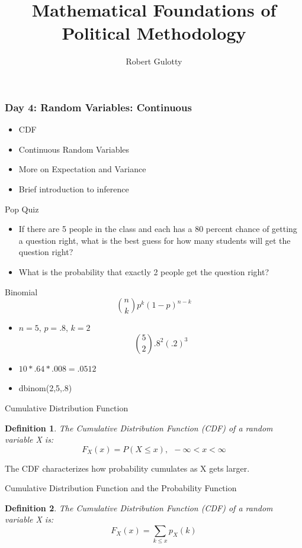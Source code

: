 \documentclass{beamer}
\title[PLSC 43401]{Mathematical Foundations of Political Methodology}
\author{Robert Gulotty}
\institute[Chicago]{University of Chicago}
\newtheorem{defn}{Definition}
\numberwithin{equation}{section}
\begin{document}
\begin{frame}
\maketitle
\end{frame}


\begin{frame}
\frametitle{Day 4: Random Variables: Continuous}
\begin{itemize}
\item CDF
\item Continuous Random Variables
\item More on Expectation and Variance
\item Brief introduction to inference
\end{itemize}
\end{frame}


\begin{frame}{Pop Quiz}
\begin{itemize}
\item If there are 5 people in the class and each has a 80 percent chance of getting a question right, what is the best guess for how many students will get the question right?
\item What is the probability that exactly 2 people get the question right?  
\end{itemize}
\end{frame}


\begin{frame}{Binomial}
$${n \choose k}p^k(1-p)^{n-k}$$

\begin{itemize}
\item $n=5$, $p=.8$, $k=2$\pause
$${5 \choose 2}.8^{2}(.2)^{3}$$
\item $10*.64*.008=.0512$
\item dbinom(2,5,.8)
\end{itemize}
\end{frame}


\begin{frame}{Cumulative Distribution Function}
\begin{defn}
The Cumulative Distribution Function (CDF) of a random variable X is:
$$F_X(x)=P(X\leq x),\ \ -\infty<x<\infty$$
\end{defn}

The CDF characterizes how probability cumulates as X gets larger.
\end{frame}

\begin{frame}{Cumulative Distribution Function and the Probability Function}
\begin{defn}
The Cumulative Distribution Function (CDF) of a random variable X is:
$$F_X(x)=\sum_{k\leq x} p_X(k)$$
\end{defn}
\end{frame}
\end{document}
